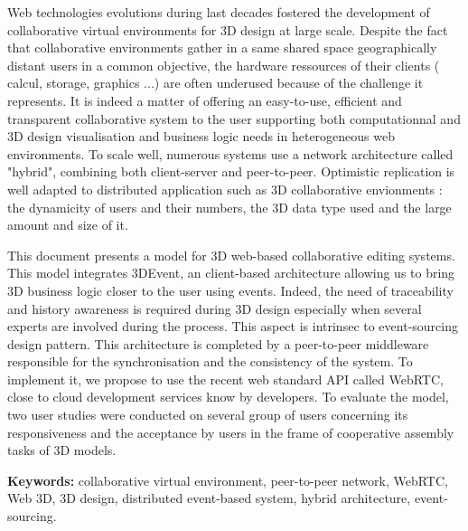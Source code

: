 Web technologies evolutions during last decades fostered the development of 
collaborative virtual environments for 3D design at large scale. Despite the fact 
that collaborative environments gather in a same shared space geographically 
distant users in a common objective, the hardware ressources of their clients (
calcul, storage, graphics ...) are often underused because of the challenge it 
represents. It is indeed a matter of offering an easy-to-use, efficient and 
transparent collaborative system to the user supporting both computationnal and 
3D 
design visualisation and business logic needs in heterogeneous web 
environments. 
To scale well, numerous systems use a network architecture called "hybrid",  
combining both client-server and peer-to-peer. Optimistic 
replication is well adapted to distributed application such as 3D collaborative 
envionments : the dynamicity of users and their numbers, the 3D data type 
used and the large amount and size of it.

This document presents a model for 3D web-based collaborative editing systems. 
This model integrates 3DEvent, an client-based architecture allowing us to bring 
3D business logic closer to the user using events. Indeed, the need of traceability 
and history awareness is required during 3D design especially when several 
experts are involved during the process. This aspect is intrinsec to event-sourcing 
design pattern. This architecture is completed by a peer-to-peer middleware 
responsible for the synchronisation and the consistency of the system. To 
implement it, we propose to use the recent web standard API called WebRTC, 
close to cloud development services know by developers. To evaluate the model, 
two user studies were conducted on several group of users concerning its 
responsiveness and the acceptance by users in the frame of cooperative 
assembly tasks of 3D models.

\textbf{Keywords:} collaborative virtual environment, peer-to-peer network, 
WebRTC, Web 3D, 3D design, distributed event-based system, hybrid 
architecture, event-sourcing.
